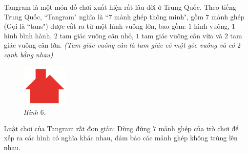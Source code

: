 	\vspace*{-5pt}
	\begin{multicols}{2}
		Tangram là một món đồ chơi xuất hiện rất lâu đời ở Trung Quốc. Theo tiếng Trung Quốc, ``Tangram" nghĩa là ``$7$ mảnh ghép thông minh", gồm $7$ mảnh ghép (Gọi là ``tans") được cắt ra từ một hình vuông lớn, bao gồm: $1$ hình vuông, $1$ hình bình hành, $2$ tam giác vuông cân nhỏ, $1$ tam giác vuông cân vừa và $2$ tam giác vuông cân lớn.
		\vskip 0.1cm
		\textit{\small (Tam giác vuông cân là tam giác có một góc vuông và có $2$ cạnh bằng nhau)}
		\begin{figure}[H]
			\vspace*{-20pt}	
			\captionsetup{labelformat=empty}
			\centering
			\captionsetup{justification=raggedleft}
			\includegraphics[width =0.2\textwidth]{image6}
			\caption{\small\it Hình $6$.}
		\end{figure}
	\end{multicols}
	\vspace*{-5pt}
	Luật chơi của Tangram rất đơn giản: Dùng đúng $7$ mảnh ghép của trò chơi để xếp ra các hình có nghĩa khác nhau, đảm bảo các mảnh ghép không trùng lên nhau.
	\vspace*{-5pt}
